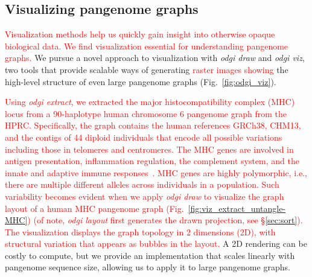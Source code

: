 \documentclass{bioinfo}
\newcommand{\REVIEWED}[1]{{\textcolor{Red}{#1}}}
\begin{document}
\subsection{Visualizing pangenome graphs}
\label{sec:viz}


\REVIEWED{Visualization methods help us quickly gain insight into otherwise opaque biological data.
We find visualization essential for understanding pangenome graphs.}
We pursue a novel approach to visualization with \textit{odgi draw} and \textit{odgi viz}, two tools that provide scalable ways of generating \REVIEWED{raster images showing} the high-level structure of even large pangenome graphs (Fig.~\ref{fig:odgi_viz}).

\REVIEWED{Using \textit{odgi extract}, we extracted the major histocompatibility complex (MHC) locus from a 90-haplotype human chromosome 6 pangenome graph from the HPRC.
Specifically, the graph contains the human references GRCh38, CHM13, and the contigs of 44 diploid individuals that encode all possible variations including those in telomeres and centromeres.
The MHC genes are involved in antigen presentation, inflammation regulation, the complement system, and the innate and adaptive immune responses~\citep{Shiina2009}.
MHC genes are highly polymorphic, i.e., there are multiple different alleles across individuals in a population.
Such variability becomes evident when we apply \textit{odgi draw} to visualize the graph layout of a human MHC pangenome graph (Fig.~\ref{fig:viz_extract_untangle-MHC}) (of note, \textit{odgi layout} first generates the drawn projection, see \S\ref{sec:sort}).
The visualization displays the graph topology in 2 dimensions (2D), with structural variation that appears as bubbles in the layout.}
A 2D rendering can be costly to compute, but we provide an implementation that scales linearly with pangenome sequence size, allowing us to apply it to large pangenome graphs.
\end{document}

